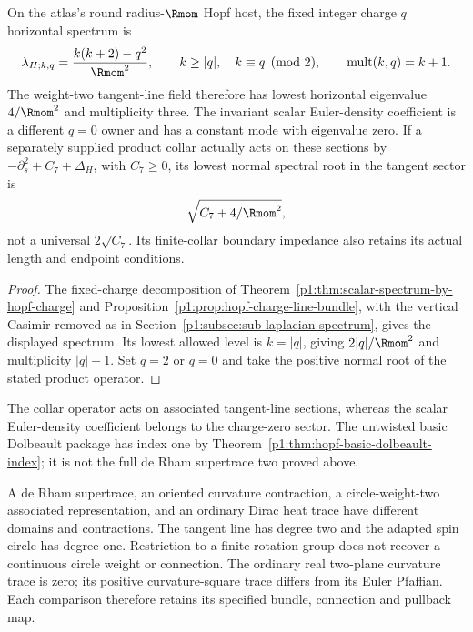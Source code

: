 \documentclass[11pt]{article}
\begin{document}
\begin{corollary}
\label{p1:cor:v2203-tangent-charge-gap}
On the atlas's round radius-\(\Rmom\) Hopf host, the fixed integer charge
\(q\) horizontal spectrum is
\[
 \lambda_{H;k,q}=\frac{k(k+2)-q^2}{\Rmom^2},
 \qquad k\ge|q|,\quad k\equiv q\pmod2,
 \qquad \operatorname{mult}(k,q)=k+1.
\]
The weight-two tangent-line field therefore has lowest horizontal
eigenvalue \(4/\Rmom^2\) and multiplicity three. The invariant scalar
Euler-density coefficient is a different \(q=0\) owner and has a constant
mode with eigenvalue zero. If a separately supplied product collar actually
acts on these sections by
\(-\partial_s^2+C_7+\Delta_H\), with \(C_7\ge0\), its lowest normal
spectral root in the tangent sector is
\[
 \sqrt{C_7+4/\Rmom^2},
\]
not a universal \(2\sqrt{C_7}\). Its finite-collar boundary impedance
also retains its actual length and endpoint conditions.
\end{corollary}
\begin{proof}
The fixed-charge decomposition of
Theorem~\ref{p1:thm:scalar-spectrum-by-hopf-charge} and
Proposition~\ref{p1:prop:hopf-charge-line-bundle}, with the vertical Casimir
removed as in Section~\ref{p1:subsec:sub-laplacian-spectrum}, gives the
displayed spectrum. Its lowest allowed level is \(k=|q|\), giving
\(2|q|/\Rmom^2\) and multiplicity \(|q|+1\). Set \(q=2\) or \(q=0\)
and take the positive normal root of the stated product operator.
\end{proof}
The collar operator acts on associated tangent-line sections, whereas
the scalar Euler-density coefficient belongs to the charge-zero sector.
The untwisted basic Dolbeault package has
index one by Theorem~\ref{p1:thm:hopf-basic-dolbeault-index}; it is not the
full de Rham supertrace two proved above.

\begin{remark}
\label{p1:rem:v2203-euler-physical-scope}
A de Rham supertrace, an oriented curvature contraction, a circle-weight-two
associated representation, and an ordinary Dirac heat trace have different
domains and contractions.  The tangent line has degree two and the adapted
spin circle has degree one.  Restriction to a finite rotation group does not
recover a continuous circle weight or connection.  The ordinary real
two-plane curvature trace is zero; its positive curvature-square trace
differs from its Euler Pfaffian.  Each comparison therefore retains its
specified bundle, connection and pullback map.
\end{remark}
\end{document}
